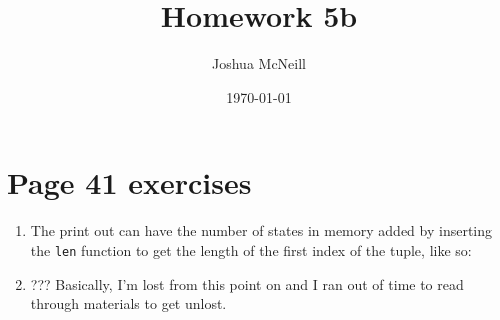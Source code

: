 \documentclass{article}
\title{Homework 5b}
\author{Joshua McNeill}
\date{\today}
\begin{document}
  \maketitle
  \section{Page 41 exercises}
    \begin{enumerate}
      \item The print out can have the number of states in memory added by inserting the \texttt{len} function to get the length of the first index of the tuple, like so:
      
      \item ??? Basically, I'm lost from this point on and I ran out of time to read through materials to get unlost.
    \end{enumerate}
\end{document}
